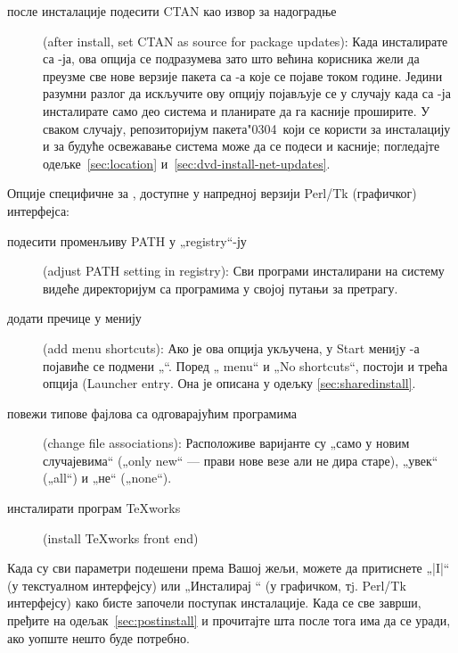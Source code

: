 \documentclass{article}
\begin{document}
\begin{description}
\item[после инсталације подесити CTAN као извор за надоградње]
  (\textenglish{after install, set CTAN as source for package updates}):
  Када инсталирате са \DVD-ја, ова опција се подразумева зато што већина
  корисника жели да преузме све нове верзије пакета са \CTAN-а које се
  појаве током године. Једини разумни разлог да искључите ову опцију
  појављује се у случају када са \DVD-ја инсталирате само део система и
  планирате да га касније проширите. У сваком случају, репозиторијум
  пакета\char"0304\ који се користи за инсталацију и за будуће
  освежавање система може да се подеси и касније; погледајте
  одељке~\ref{sec:location} и~\ref{sec:dvd-install-net-updates}.
\end{description}

Опције специфичне за \Windows{}, доступне у напредној верзији Perl/Tk
(графичког) интерфејса:

\begin{description}
\item[подесити променљиву PATH у „registry“-ју] (\textenglish{adjust
  PATH setting in registry}): Сви програми инсталирани на систему видеће
  директоријум са програмима \TL{} у својој путањи за претрагу.

\item[додати пречице у менију] (\textenglish{add menu shortcuts}): Ако
  је ова опција укључена, у \textenglish{Start} мениjу \Windows{}-а
  појавиће се подмени „\TL{}“. Поред „\textenglish{\TL{} menu}“ и
  „\textenglish{No shortcuts}“, постоји и трећа опција
  (\textenglish{Launcher entry}. Она је описана у одељку
  \ref{sec:sharedinstall}.

\item[повежи типове фајлова са одговарајућим програмима]
  (\textenglish{change file associations}): Расположиве варијанте су
  „само у новим случајевима“ („\textenglish{only new}“ --- прави нове
  везе али не дира старе), „увек“ („\textenglish{all}“) и „не“
  („\textenglish{none}“).

\item[инсталирати програм \TeX{}works] (\textenglish{install \TeX{}works
  front end})
\end{description}

Када су сви параметри подешени према Вашој жељи, можете да притиснете
„|I|“ (у текстуалном интерфејсу) или „Инсталирај \TL{}“ (у графичком,
тj. Perl/Tk \GUI{} интерфејсу) како бисте започели поступак инсталације.
Када се све заврши, пређите на одељак~\ref{sec:postinstall} и прочитајте
шта после тога има да се уради, ако уопште нешто буде потребно.
\end{document}

